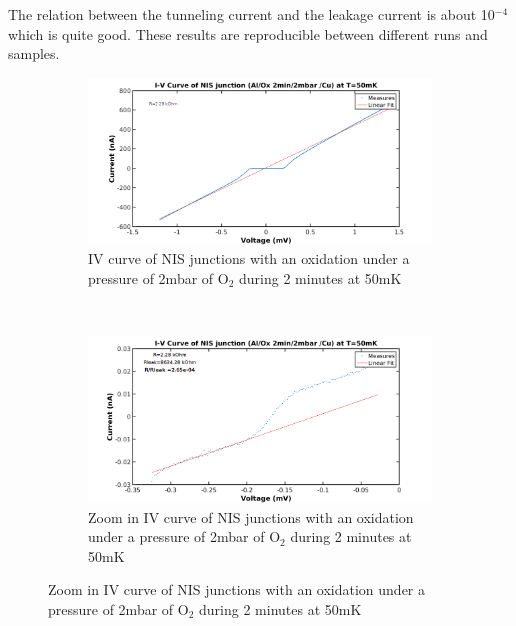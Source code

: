                  The relation between the tunneling current and the leakage current is about 10$^{-4}$ which is quite good. These results are reproducible between different runs and samples. 
                
                \begin{figure}
                    \centering
                    \begin{subfigure}{\textwidth}
                    \centering
                    \includegraphics[width=15cm]{IVlargeNIS.png}
                    \caption{IV curve of NIS junctions with an oxidation under a pressure of 2mbar of O$_2$ during 2 minutes at 50mK}
                    
                    \label{IVlargeNIS}
                    \end{subfigure}
                    ~
                    \begin{subfigure}{\textwidth}
                    \centering
                    \includegraphics[width=15cm]{IVleakNIS.png}
                    \caption{Zoom in IV curve of NIS junctions with an oxidation under a pressure of 2mbar of O$_2$ during 2 minutes at 50mK}
                    \label{IVleakNIS}
                    \end{subfigure}
                \end{figure}
        
